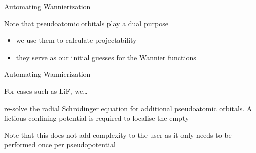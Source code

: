 \documentclass[xcolor=table,aspectratio=169]{beamer}
\numberwithin{equation}{section}
\begin{document}
\begin{frame}{Automating Wannierization}

   Note that pseudoatomic orbitals play a dual purpose
   \begin{itemize}
      \item we use them to calculate projectability
      \item they serve as our initial guesses for the Wannier functions 
   \end{itemize}



   \vspace{1ex}

   \vspace{1ex}

\end{frame}

\begin{frame}{Automating Wannierization}

   For cases such as LiF, we\dots
   
   re-solve the radial Schrödinger equation for additional pseudoatomic orbitals. A fictious confining potential is required to localise the empty 

   Note that this does not add complexity to the user as it only needs to be performed once per pseudopotential

\end{frame}
\end{document}
